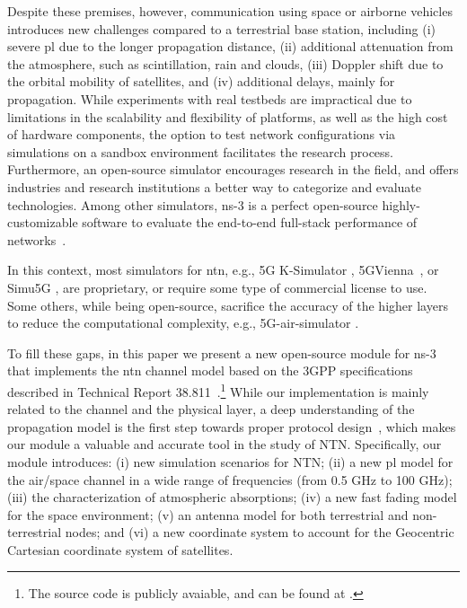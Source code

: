 Despite these premises, however, communication using space or airborne vehicles introduces new challenges compared to a terrestrial base station, including (i) severe \gls{pl} due to the longer propagation distance, (ii) additional attenuation from the atmosphere, such as scintillation, rain and clouds, (iii) Doppler shift due to the orbital mobility of satellites, and (iv) additional delays, mainly for propagation.
While experiments with real testbeds are impractical due to limitations in the scalability and flexibility of platforms, as well as the high cost of hardware components, the option to test network configurations via simulations on a sandbox environment facilitates the research process. Furthermore, an open-source simulator encourages research in the field, and offers industries and research institutions a better way to categorize and evaluate technologies. Among other simulators, ns-3 is a perfect open-source highly-customizable software to evaluate the end-to-end full-stack performance of networks~\cite{henderson2008network}.

In this context, most simulators for \gls{ntn}, e.g., 5G K-Simulator \cite{5gksimulator}, 5GVienna~\cite{vienna5gsimulator}, or Simu5G \cite{simu5g}, are proprietary, or require some type of commercial license to use. Some others, while being open-source, sacrifice the accuracy of the higher layers to reduce the computational complexity, e.g., 5G-air-simulator \cite{5gairsimulator}. 

To fill these gaps, in this paper we present a new open-source module for ns-3 that implements the \gls{ntn} channel model based on the 3GPP specifications described in Technical Report 38.811~\cite{38811}.\footnote{The source code is publicly avaiable, and can be found at \cite{ntngitlab}.}
While our implementation is mainly related to the channel and the physical layer, a deep understanding of the propagation model is the first step towards proper protocol design~\cite{lecci2021accuracy}, which makes our module a valuable and accurate tool in the study of NTN.
Specifically, our module introduces: (i) new simulation scenarios for NTN; (ii) a new \gls{pl} model for the air/space channel in a wide range of frequencies (from 0.5 GHz to 100 GHz); (iii) the characterization of atmospheric absorptions; (iv) a new fast fading model for the space environment; (v) an antenna model for both terrestrial and non-terrestrial nodes; and (vi) a new coordinate system to account for the Geocentric Cartesian coordinate system of satellites. 

